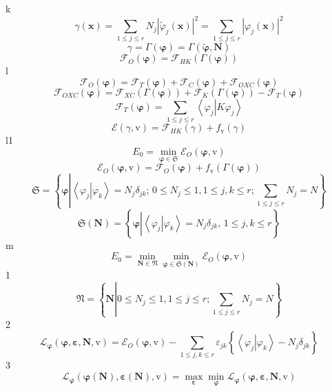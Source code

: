 \documentclass[aps,preprint]{revtex4}%
\begin{document}
k%
\[
\gamma\left(  \mathbf{x}\right)  =\sum_{1\leq j\leq r}N_{j}\left\vert
\tilde{\varphi}_{j}\left(  \mathbf{x}\right)  \right\vert ^{2}=\sum_{1\leq
j\leq r}\left\vert \varphi_{j}\left(  \mathbf{x}\right)  \right\vert ^{2}%
\]%
\[
\gamma=\Gamma\left(  \mathbf{\varphi}\right)  =\Gamma\left(  \mathbf{\tilde
{\varphi},N}\right)
\]%
\[
\mathcal{F}_{O}\left(  \mathbf{\varphi}\right)  =\mathcal{F}_{HK}\left(
\Gamma\left(  \mathbf{\varphi}\right)  \right)
\]
l%
\[
\mathcal{F}_{O}\left(  \mathbf{\varphi}\right)  =\mathcal{F}_{T}\left(
\mathbf{\varphi}\right)  +\mathcal{F}_{C}\left(  \mathbf{\varphi}\right)
+\mathcal{F}_{OXC}\left(  \mathbf{\varphi}\right)
\]%
\[
\mathcal{F}_{OXC}\left(  \mathbf{\varphi}\right)  =\mathcal{F}_{XC}\left(
\Gamma\left(  \mathbf{\varphi}\right)  \right)  +\mathcal{F}_{K}\left(
\Gamma\left(  \mathbf{\varphi}\right)  \right)  -\mathcal{F}_{T}\left(
\mathbf{\varphi}\right)
\]%
\[
\mathcal{F}_{T}\left(  \mathbf{\varphi}\right)  =\sum_{1\leq j\leq
r}\left\langle \varphi_{j}\left\vert K\varphi_{j}\right.  \right\rangle
\]%
\[
\mathcal{E}\left(  \gamma\mathbf{,}\mathrm{v}\right)  =\mathcal{F}_{HK}\left(
\gamma\right)  +f_{\mathrm{v}}\left(  \gamma\right)
\]
l1%
\[
E_{0}=\min_{\mathbf{\varphi\in}\mathfrak{S}}\mathcal{E}_{O}\left(
\mathbf{\varphi,}\mathrm{v}\right)
\]%
\[
\mathcal{E}_{O}\left(  \mathbf{\varphi,}\mathrm{v}\right)  =\mathcal{F}%
_{O}\left(  \mathbf{\varphi}\right)  +f_{\mathrm{v}}\left(  \Gamma\left(
\mathbf{\varphi}\right)  \right)
\]%
\[
\mathfrak{S}=\left\{  \mathbf{\varphi}\left\vert \left\langle \left.
\varphi_{j}\right\vert \varphi_{k}\right\rangle =N_{j}\delta_{jk};\,0\leq
N_{j}\leq1,1\leq j,k\leq r;\sum_{1\leq j\leq r}N_{j}=N\right.  \right\}
\]%
\[
\mathfrak{S}\left(  \mathbf{N}\right)  =\left\{  \mathbf{\varphi}\left\vert
\overset{}{\left\langle \left.  \varphi_{j}\right\vert \varphi_{k}%
\right\rangle =N_{j}\delta_{jk},\,1\leq j,k\leq r}\right.  \right\}
\]
m%
\[
E_{0}=\min_{\mathbf{N\in}\mathfrak{N}}\min_{\mathbf{\varphi\in}\mathfrak{S}%
\left(  \mathbf{N}\right)  }\mathcal{E}_{O}\left(  \mathbf{\varphi,}%
\mathrm{v}\right)
\]
1%
\[
\mathfrak{N=}\left\{  \mathbf{N}\left\vert 0\leq N_{j}\leq1,1\leq j\leq
r;\sum_{1\leq j\leq r}N_{j}=N\right.  \right\}
\]
2%
\[
\mathcal{L}_{\mathbf{\varphi}}\left(  \mathbf{\varphi},\mathbf{\varepsilon
,N,}\mathrm{v}\right)  =\mathcal{E}_{O}\left(  \mathbf{\varphi,}%
\mathrm{v}\right)  -\sum_{1\leq j,k\leq r}\varepsilon_{jk}\left\{  \overset
{}{\left\langle \left.  \varphi_{j}\right\vert \varphi_{k}\right\rangle
-N_{j}\delta_{jk}}\right\}
\]
3%
\[
\mathcal{L}_{\mathbf{\varphi}}\left(  \mathbf{\varphi}\left(  \mathbf{N}%
\right)  ,\mathbf{\varepsilon}\left(  \mathbf{N}\right)  ,\mathrm{v}\right)
=\max_{\mathbf{\varepsilon}}\min_{\mathbf{\varphi}}\mathcal{L}%
_{\mathbf{\varphi}}\left(  \mathbf{\varphi},\mathbf{\varepsilon,N,}%
\mathrm{v}\right)
\]
\end{document}
